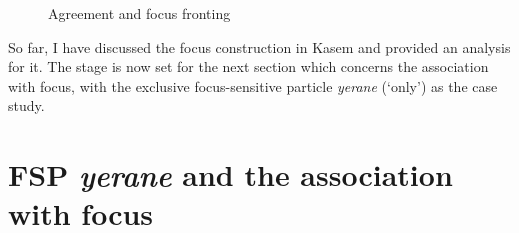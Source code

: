 \documentclass[output=paper,colorlinks,citecolor=brown,draftmode
]{langscibook}
\begin{document}
\begin{figure}
    \caption{Agreement and focus fronting}
    \label{fig:Aremu:Kasem: ex-situ focus object tree}
\end{figure} 


So far, I have discussed the focus construction in Kasem and provided an analysis for it. The stage is now set for the next section which concerns the association with focus, with the exclusive focus-sensitive particle \textit{yerane} (`only') as the case study.


\section{FSP \textit{yerane} and the association with focus} \label{sec:Aremu:FocusAssociation}
\end{document}
